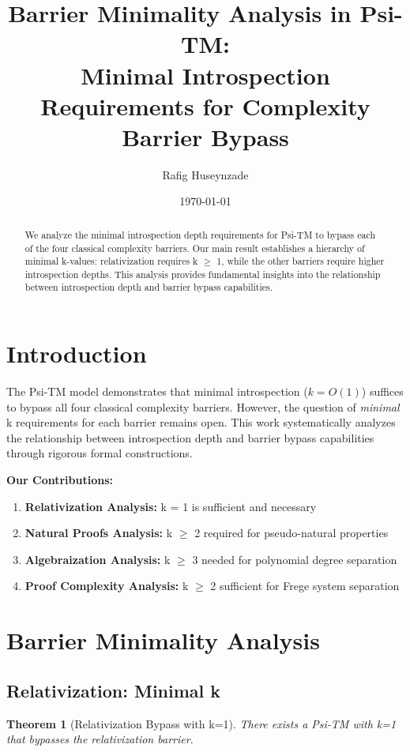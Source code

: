 \documentclass[11pt]{article}
\title{Barrier Minimality Analysis in Psi-TM:\\
\large{Minimal Introspection Requirements for Complexity Barrier Bypass}}
\author{Rafig Huseynzade}
\date{\today}
\newtheorem{theorem}{Theorem}
\begin{document}
\maketitle

\begin{abstract}
We analyze the minimal introspection depth requirements for Psi-TM to bypass each of the four classical complexity barriers. Our main result establishes a hierarchy of minimal k-values: relativization requires k $\geq$ 1, while the other barriers require higher introspection depths. This analysis provides fundamental insights into the relationship between introspection depth and barrier bypass capabilities.
\end{abstract}

\section{Introduction}

The Psi-TM model demonstrates that minimal introspection ($k = O(1)$) suffices to bypass all four classical complexity barriers. However, the question of \textit{minimal} k requirements for each barrier remains open. This work systematically analyzes the relationship between introspection depth and barrier bypass capabilities through rigorous formal constructions.

\textbf{Our Contributions:}
\begin{enumerate}
\item \textbf{Relativization Analysis:} k = 1 is sufficient and necessary
\item \textbf{Natural Proofs Analysis:} k $\geq$ 2 required for pseudo-natural properties
\item \textbf{Algebraization Analysis:} k $\geq$ 3 needed for polynomial degree separation
\item \textbf{Proof Complexity Analysis:} k $\geq$ 2 sufficient for Frege system separation
\end{enumerate}

\section{Barrier Minimality Analysis}

\subsection{Relativization: Minimal k}

\begin{theorem}[Relativization Bypass with k=1]
\label{thm:relativization-k1}
There exists a Psi-TM with k=1 that bypasses the relativization barrier.
\end{theorem}
\end{document}
